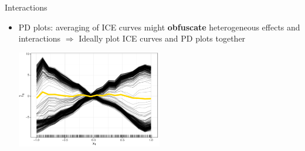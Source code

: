 \documentclass[11pt,compress,t,notes=noshow, aspectratio=169, xcolor=table]{beamer}
\begin{document}
\begin{frame}{Interactions}
\begin{itemize}

\item PD plots: averaging of ICE curves might \textbf{obfuscate} heterogeneous effects and interactions \newline \(\Rightarrow\) Ideally plot ICE curves and PD plots together

\begin{center}\includegraphics[width=0.5\textwidth]{figure/pdp_xor.pdf} \end{center}
\end{itemize}

\end{frame}


\endlecture
\end{document}
